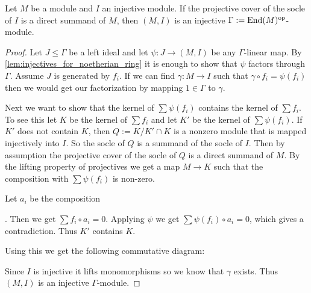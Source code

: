\begin{prop}\label{prop:hom_generator_preserves_injectives}
	Let $M$ be a module and $I$ an injective module. If the projective cover of the socle of $I$ is a direct summand of $M$, then $(M,I)$ is an injective $\Gamma:=\operatorname{End}(M)^{\operatorname{op}}$-module.
	\begin{proof}
		Let $J \leq \Gamma$ be a left ideal and let $\psi\colon J \to (M,I)$ be any $\Gamma$-linear map. By \cref{lem:injectives_for_noetherian_ring} it is enough to show that $\psi$ factors through $\Gamma$. Assume $J$ is generated by $f_i$. If we can find $\gamma\colon M \to I$ such that $\gamma \circ f_i = \psi(f_i)$ then we would get our factorization by mapping $1\in \Gamma$ to $\gamma$.
		\begin{center}
		\end{center}
		Next we want to show that the kernel of $\sum \psi(f_i)$ contains the kernel of $\sum f_i$. To see this let $K$ be the kernel of $\sum f_i$ and let $K'$ be the kernel of $\sum \psi(f_i)$. If $K'$ does not contain $K$, then $Q:= K/K'\cap K$ is a nonzero module that is mapped injectively into $I$. So the socle of $Q$ is a summand of the socle of $I$. Then by assumption the projective cover of the socle of $Q$ is a direct summand of $M$. By the lifting property of projectives we get a map $M \to K$ such that the composition with $\sum \psi(f_i)$ is non-zero.
		
		Let $a_i$ be the composition 
		.
		Then we get $\sum f_i \circ a_i = 0$. Applying $\psi$ we get $\sum \psi(f_i)\circ a_i = 0$, which gives a contradiction. Thus $K'$ contains $K$.
		
		Using this we get the following commutative diagram:
		\begin{center}
		\end{center}
		Since $I$ is injective it lifts monomorphisms so we know that $\gamma$ exists. Thus $(M, I)$ is an injective $\Gamma$-module.
	\end{proof}
\end{prop}

